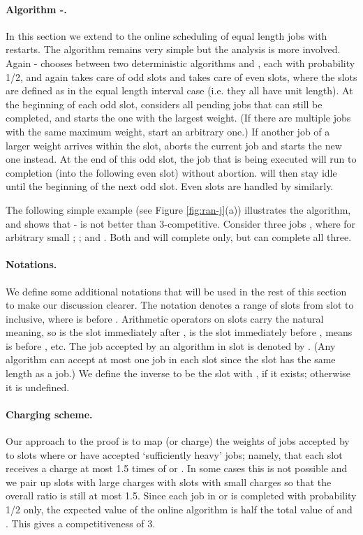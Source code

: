 \documentclass[11pt]{article}
\begin{document}
\paragraph{Algorithm -.}
In this section we extend  to the online scheduling of 
equal length jobs with restarts.
The algorithm remains very simple but the analysis is more involved.
Again - chooses between two deterministic algorithms  and , 
each with probability 1/2, and again
 takes care of odd slots and  takes care of even slots,
where the slots are defined as in the equal length interval case
(i.e. they all have unit length).  
At the beginning of each odd slot,  considers all pending jobs that can 
still be completed, and starts the one with the largest weight.
(If there are multiple jobs with the same maximum weight, start an 
arbitrary one.)
If another job of a larger weight arrives within the slot, 
 aborts the current job and starts the new one instead.  
At the end of this odd slot, the job that is being executed will run to
completion (into the following even slot) without abortion.
 will then stay idle until the beginning of the next odd slot.
Even slots are handled by  similarly.

The following simple example (see Figure \ref{fig:ran-j}(a))  
illustrates the algorithm, and shows that 
- is not better than 3-competitive. 
Consider three jobs , where  for
arbitrary small ;
; and
.
Both  and  will complete  only, but  can complete all three.

\paragraph{Notations.}
We define some additional notations that will be used in the rest of 
this section to make our discussion clearer.
The notation  denotes a range of slots 
from slot  to  inclusive, where  is before .
Arithmetic operators on slots carry the natural meaning,
so  is the slot immediately after ,
 is the slot immediately before , 
means  is before , etc.
The job accepted by an algorithm  in slot  is denoted by .
(Any algorithm can accept at most one job in each slot since the slot has
the same length as a job.)
We define the inverse  to be the slot  with , 
if it exists; otherwise it is undefined.

\paragraph{Charging scheme.}
Our approach to the proof is to map (or charge) the weights of jobs 
accepted by  to slots where  or  have accepted `sufficiently
heavy' jobs; namely, that each slot  
receives a charge at most 1.5 times of  or .
In some cases this is not possible and we pair up slots with large charges
with slots with small charges so that the overall ratio is still at most
1.5.  Since each job in  or  is completed with probability 1/2 only,
the expected value of the online algorithm is half the total value of 
 and .  This gives a competitiveness of 3.
\end{document}
